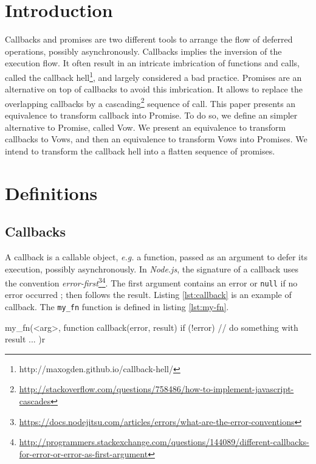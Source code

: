 \section{Introduction}

Callbacks and promises are two different tools to arrange the flow of deferred operations, possibly asynchronously.
Callbacks implies the inversion of the execution flow.
It often result in an intricate imbrication of functions and calls, called the callback hell\footnote{\raggedright http://maxogden.github.io/callback-hell/}, and largely considered a bad practice.
Promises are an alternative on top of callbacks to avoid this imbrication.
It allows to replace the overlapping callbacks by a cascading\footnote{\url{http://stackoverflow.com/questions/758486/how-to-implement-javascript-cascades}} sequence of call.
This paper presents an equivalence to transform callback into Promise.
To do so, we define an simpler alternative to Promise, called Vow.
We present an equivalence to transform callbacks to Vows, and then an equivalence to transform Vows into Promises.
We intend to transform the callback hell into a flatten sequence of promises.

\section{Definitions}

\subsection{Callbacks}

A callback is a callable object, \textit{e.g.} a function, passed as an argument to defer its execution, possibly asynchronously.
In \textit{Node.js}, the signature of a callback uses the convention \textit{error-first}\footnote{\url{https://docs.nodejitsu.com/articles/errors/what-are-the-error-conventions}}\footnote{\url{http://programmers.stackexchange.com/questions/144089/different-callbacks-for-error-or-error-as-first-argument}}.
The first argument contains an error or \texttt{null} if no error occurred ; then follows the result.
Listing \ref{lst:callback} is an example of callback.
The \texttt{my_fn} function is defined in listing \ref{lst:my-fn}.

\begin{code}[js, %
             caption={Example of a callback}, %
             label={lst:callback}] %
my_fn(<arg>, function callback(error, result) {
  if (!error) {
    // do something with result ...
  }
})r
\end{code}

